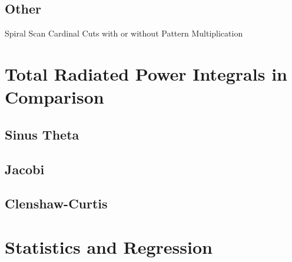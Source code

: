 \subsection{Other}

Spiral Scan
Cardinal Cuts with or without Pattern Multiplication

\section{Total Radiated Power Integrals in Comparison}

\subsection{Sinus Theta}

\subsection{Jacobi}

\subsection{Clenshaw-Curtis}

\section{Statistics and Regression}
